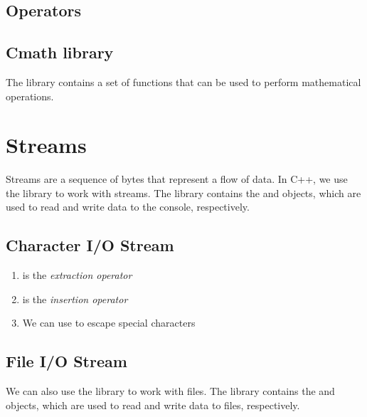 \documentclass{article}
\begin{document}
\subsection{Operators}


\subsection{Cmath library}
The  library contains a set of functions that can be used to perform mathematical operations.


\section{Streams}
Streams are a sequence of bytes that represent a flow of data. In C++, we use the  library to work with streams. The  library contains the  and  objects, which are used to read and write data to the console, respectively.
\subsection{Character I/O Stream}

\begin{enumerate}
    \item {} is the \emph{extraction operator}
    \item {} is the \emph{insertion operator}
    \item We can use  to escape special characters
\end{enumerate}

\subsection{File I/O Stream}
We can also use the  library to work with files. The  library contains the  and  objects, which are used to read and write data to files, respectively.
\end{document}
